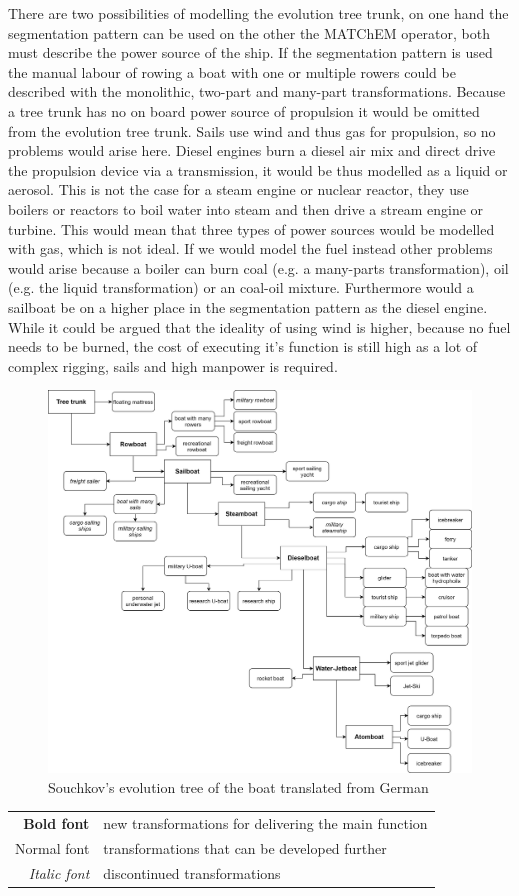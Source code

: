 \documentclass[11pt,a4paper]{article}
\begin{document}
There are two possibilities of modelling the evolution tree trunk, on one hand
the segmentation pattern can be used on the other the MATChEM operator, both
must describe the power source of the ship. If the segmentation pattern is
used the manual labour of rowing a boat with one or multiple rowers could be
described with the monolithic, two-part and many-part transformations. Because
a tree trunk has no on board power source of propulsion it would be omitted
from the evolution tree trunk. Sails use wind and thus gas for propulsion, so
no problems would arise here. Diesel engines burn a diesel air mix and direct
drive the propulsion device via a transmission, it would be thus modelled as a
liquid or aerosol. This is not the case for a steam engine or nuclear reactor,
they use boilers or reactors to boil water into steam and then drive a stream
engine or turbine. This would mean that three types of power sources would be
modelled with gas, which is not ideal. If we would model the fuel instead
other problems would arise because a boiler can burn coal (e.g. a many-parts
transformation), oil (e.g. the liquid transformation) or an coal-oil
mixture. Furthermore would a sailboat be on a higher place in the segmentation
pattern as the diesel engine. While it could be argued that the ideality of
using wind is higher, because no fuel needs to be burned, the cost of
executing it's function is still high as a lot of complex rigging, sails and
high manpower is required. 

\begin{figure}[htb]
  \centering
  \includegraphics[width=\linewidth]{figures/boat.png}
  \caption{\small Souchkov's evolution tree of the boat translated from German
    \cite{KS}}
	\label{fig:boat}
\end{figure}
\begin{tabular}{r@{: }l}
\textbf{Bold font} & new transformations for delivering the main function\\
Normal font & transformations that can be developed further\\
\textit{Italic font} & discontinued transformations
\end{tabular}
\end{document}
